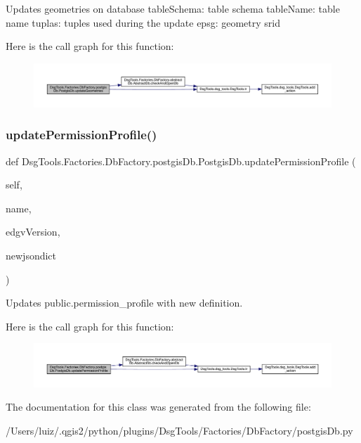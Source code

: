 \begin{DoxyVerb}Updates geometries on database
tableSchema: table schema
tableName: table name
tuplas: tuples used during the update
epsg: geometry srid
\end{DoxyVerb}
 Here is the call graph for this function\+:
\nopagebreak
\begin{figure}[H]
\begin{center}
\leavevmode
\includegraphics[width=350pt]{class_dsg_tools_1_1_factories_1_1_db_factory_1_1postgis_db_1_1_postgis_db_a215b17e70db71b8e917a73276896f9ab_cgraph}
\end{center}
\end{figure}
\mbox{\label{class_dsg_tools_1_1_factories_1_1_db_factory_1_1postgis_db_1_1_postgis_db_a02f4672a174dd393920510cc73fa31de}} 
\subsubsection{\texorpdfstring{update\+Permission\+Profile()}{updatePermissionProfile()}}
{\footnotesize\ttfamily def Dsg\+Tools.\+Factories.\+Db\+Factory.\+postgis\+Db.\+Postgis\+Db.\+update\+Permission\+Profile (\begin{DoxyParamCaption}\item[{}]{self,  }\item[{}]{name,  }\item[{}]{edgv\+Version,  }\item[{}]{newjsondict }\end{DoxyParamCaption})}

\begin{DoxyVerb}Updates public.permission_profile with new definition.
\end{DoxyVerb}
 Here is the call graph for this function\+:
\nopagebreak
\begin{figure}[H]
\begin{center}
\leavevmode
\includegraphics[width=350pt]{class_dsg_tools_1_1_factories_1_1_db_factory_1_1postgis_db_1_1_postgis_db_a02f4672a174dd393920510cc73fa31de_cgraph}
\end{center}
\end{figure}


The documentation for this class was generated from the following file\+:\begin{DoxyCompactItemize}
\item 
/\+Users/luiz/.\+qgis2/python/plugins/\+Dsg\+Tools/\+Factories/\+Db\+Factory/postgis\+Db.\+py\end{DoxyCompactItemize}
